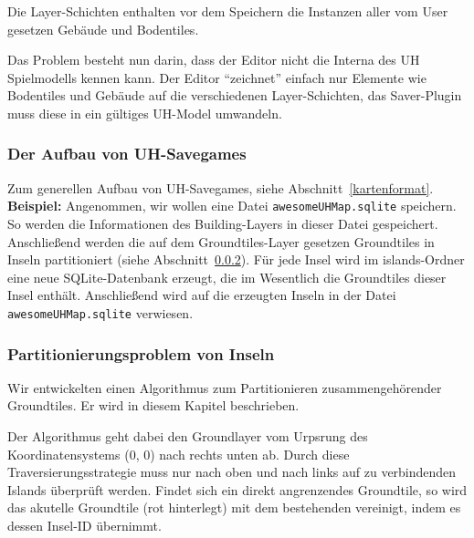 Die Layer-Schichten enthalten vor dem Speichern die Instanzen aller vom User
gesetzen Gebäude und Bodentiles.

Das Problem besteht nun darin, dass der Editor nicht die
Interna des UH Spielmodells kennen kann. Der Editor ``zeichnet'' einfach nur
Elemente wie Bodentiles und Gebäude auf die verschiedenen Layer-Schichten, das
Saver-Plugin muss diese in ein gültiges UH-Model umwandeln.

\subsubsection{Der Aufbau von UH-Savegames}
Zum generellen Aufbau von UH-Savegames, siehe Abschnitt~\ref{kartenformat}.
{\bf Beispiel:} Angenommen, wir wollen eine Datei {\tt awesomeUHMap.sqlite}
speichern. So werden die Informationen des Building-Layers in dieser Datei
gespeichert. Anschließend werden die auf dem Groundtiles-Layer gesetzen
Groundtiles in Inseln partitioniert (siehe Abschnitt~\ref{sec:partionierung}).
Für jede Insel wird im islands-Ordner eine neue SQLite-Datenbank erzeugt, die im
Wesentlich die Groundtiles dieser Insel enthält. Anschließend wird auf die
erzeugten Inseln in der Datei {\tt awesomeUHMap.sqlite} verwiesen.

\subsubsection{Partitionierungsproblem von Inseln}
\label{sec:partionierung}
Wir entwickelten einen Algorithmus zum Partitionieren zusammengehörender
Groundtiles. Er wird in diesem Kapitel beschrieben.

Der Algorithmus geht dabei den Groundlayer vom Urpsrung des Koordinatensystems
(0, 0) nach rechts unten ab. Durch diese Traversierungsstrategie muss nur nach
oben und nach links auf zu verbindenden Islands überprüft werden. Findet sich
ein direkt angrenzendes Groundtile, so wird das akutelle Groundtile (rot
hinterlegt) mit dem bestehenden vereinigt, indem es dessen Insel-ID übernimmt.

